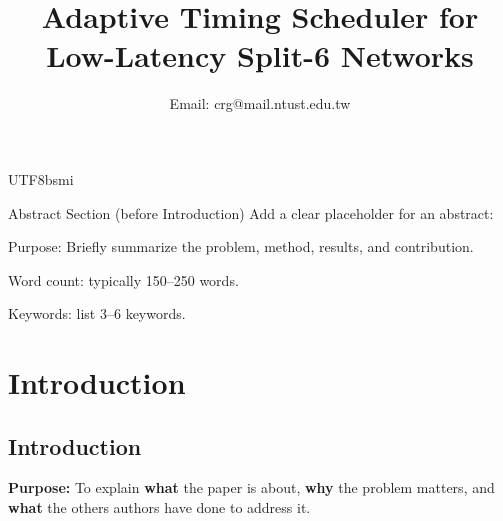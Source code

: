 \documentclass[conference]{IEEEtran}
\begin{document}
\begin{CJK}{UTF8}{bsmi}
\title{Adaptive Timing Scheduler for Low-Latency Split-6 Networks}
\author{
\author{
  Email: crg@mail.ntust.edu.tw
}

}

\maketitle

Abstract Section (before Introduction)
Add a clear placeholder for an abstract:

Purpose: Briefly summarize the problem, method, results, and contribution.

Word count: typically 150–250 words.

Keywords: list 3–6 keywords.

\section{Introduction}
\subsection{Introduction}
{\bf Purpose:} To explain {\bf what} the paper is about, {\bf why} the problem matters, and {\bf what} the others authors have done to address it.


\end{CJK}
\end{document}
